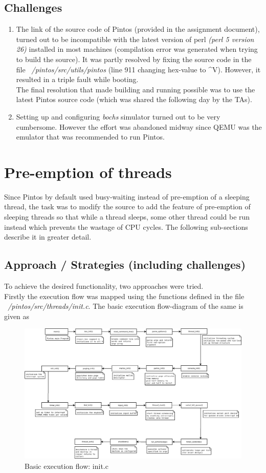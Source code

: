 \documentclass[]{article}
\begin{document}
	\subsection{Challenges}
		\begin{enumerate}
			\item The link of the source code of Pintos (provided in the assignment document), turned out to be incompatible with the latest version of perl \textit{(perl 5 version 26)} installed in most machines (compilation error was generated when trying to build the source). It was partly resolved by fixing the source code in the file \textit{~/pintos/src/utils/pintos} (line 911 changing hex-value to \^\/V). However, it resulted in a triple fault while booting. \\The final resolution that made building and running possible was to use the latest Pintos source code (which was shared the following day by the TAs).
			\item Setting up and configuring \textit{bochs} simulator turned out to be very cumbersome. However the effort was abandoned midway since QEMU was the emulator that was recommended to run Pintos.
		\end{enumerate}
	

\section {Pre-emption of threads}
	Since Pintos by default used busy-waiting instead of pre-emption of a sleeping thread, the task was to modify the source to add the feature of pre-emption of sleeping threads so that while a thread sleeps, some other thread could be run instead which prevents the wastage of CPU cycles. The following sub-sections describe it in greater detail.
	\subsection{Approach / Strategies (including challenges)}
		To achieve the desired functionality, two approaches were tried.\\
		Firstly the execution flow was mapped using the functions defined in the file \textit{~/pintos/src/threads/init.c}. The basic execution flow-diagram of the same is given as  \\
		\begin{figure}[H]
			\centering
			\includegraphics[scale=0.275]{"main_pintos"}
			\caption{Basic execution flow: init.c}
		\end{figure}
		
\end{document}
